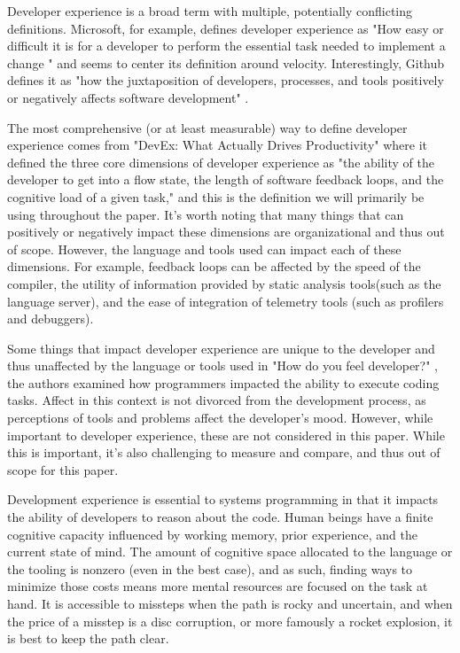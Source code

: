 \documentclass[conference]{IEEEtran}
\begin{document}
Developer experience is a broad term with multiple, potentially conflicting definitions. Microsoft, for example, defines developer experience as "How easy or difficult it is for a developer to perform the essential task needed to implement a change "\cite{DeveloperExperienceDevEx} and seems to center its definition around velocity. Interestingly, Github defines it as "how the juxtaposition of developers, processes, and tools positively or negatively affects software development" \cite{davisDeveloperExperienceWhat2023}.

The most comprehensive (or at least measurable) way to define developer experience comes from "DevEx: What Actually Drives Productivity" \cite{nodaDevExWhatActually2023} where it defined the three core dimensions of developer experience as "the ability of the developer to get into a flow state, the length of software feedback loops, and the cognitive load of a given task," and this is the definition we will primarily be using throughout the paper. It's worth noting that many things that can positively or negatively impact these dimensions are organizational and thus out of scope. However, the language and tools used can impact each of these dimensions. For example, feedback loops can be affected by the speed of the compiler, the utility of information provided by static analysis tools(such as the language server), and the ease of integration of telemetry tools (such as profilers and debuggers).

Some things that impact developer experience are unique to the developer and thus unaffected by the language or tools used in "How do you feel developer?" \cite{graziotin2015you}, the authors examined how programmers impacted the ability to execute coding tasks. Affect in this context is not divorced from the development process, as perceptions of tools and problems affect the developer's mood. However, while important to developer experience, these are not considered in this paper. While this is important, it's also challenging to measure and compare, and thus out of scope for this paper.

Development experience is essential to systems programming in that it impacts the ability of developers to reason about the code. Human beings have a finite cognitive capacity influenced by working memory, prior experience, and the current state of mind. The amount of cognitive space allocated to the language or the tooling is nonzero (even in the best case), and as such, finding ways to minimize those costs means more mental resources are focused on the task at hand. It is accessible to missteps when the path is rocky and uncertain, and when the price of a misstep is a disc corruption\cite{larabelItLooksThere2016}, or more famously a rocket explosion\cite{dowsonArianeSoftwareFailure1997}, it is best to keep the path clear.
\end{document}
